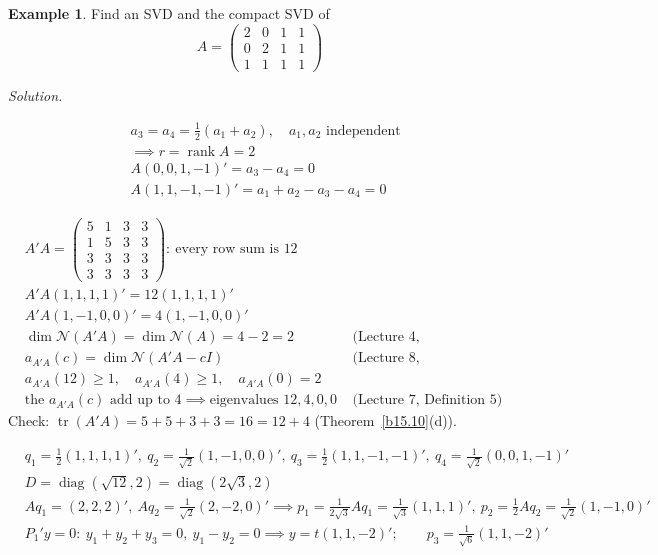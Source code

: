 \documentclass[12pt]{article}
\DeclareMathOperator{\tr}{tr}
\DeclareMathOperator{\diag}{diag}
\DeclareMathOperator{\rank}{rank}
\theoremstyle{definition}
\newtheorem{example}[theorem]{Example}
\newcommand{\lec}[1]{Lecture~#1}
\newcommand{\boardtop}{\vspace*{-\abovedisplayskip}}
\begin{document}
\begin{example}\label{b15.12}
Find an SVD and the compact SVD of
\[
A=\begin{pmatrix}2&0&1&1\\0&2&1&1\\1&1&1&1\end{pmatrix}
\]
\end{example}
\textit{Solution.}
\begin{board}[Columns \(a_1,\dots,a_4\) of \(A\); \(\rank A=\dim\mathcal C(A)\) (\lec{4}, Definition~10):]
\boardtop
\begin{align*}
&a_3=a_4=\tfrac12(a_1+a_2),\quad a_1,a_2\text{ independent}\\
&\implies r=\rank A=2\\
&A(0,0,1,-1)'=a_3-a_4=0\\
&A(1,1,-1,-1)'=a_1+a_2-a_3-a_4=0
\end{align*}
\end{board}
\begin{board}
\boardtop
\begin{align*}
&A'A=\begin{pmatrix}5&1&3&3\\1&5&3&3\\3&3&3&3\\3&3&3&3\end{pmatrix}\colon\ \text{every row sum is }12\\
&A'A(1,1,1,1)'=12(1,1,1,1)'\\
&A'A(1,-1,0,0)'=4(1,-1,0,0)'\\
&\dim\mathcal N(A'A)=\dim\mathcal N(A)=4-2=2&&\text{(\lec{4}, Theorems~16(a), 11)}\\
&a_{A'A}(c)=\dim\mathcal N(A'A-cI)&&\text{(\lec{8}, Theorem~9(b))}\\
&a_{A'A}(12)\geqslant1,\quad a_{A'A}(4)\geqslant1,\quad a_{A'A}(0)=2\\
&\text{the }a_{A'A}(c)\text{ add up to }4\implies\text{eigenvalues }12,4,0,0&&\text{(\lec{7}, Definition~5)}
\end{align*}
Check: \(\tr(A'A)=5+5+3+3=16=12+4\) (Theorem~\ref{b15.10}(d)).
\end{board}
\begin{board}[Theorem~\ref{b15.9}(b). By \lec{8}, Theorem~8, and \((1,1,-1,-1)(0,0,1,-1)'=0\), the four vectors are
pairwise orthogonal; normalize them:]
\boardtop
\begin{align*}
&q_1=\tfrac12(1,1,1,1)',\ q_2=\tfrac1{\sqrt2}(1,-1,0,0)',\ q_3=\tfrac12(1,1,-1,-1)',\ q_4=\tfrac1{\sqrt2}(0,0,1,-1)'\\
&D=\diag(\sqrt{12},2)=\diag(2\sqrt3,2)\\
&Aq_1=(2,2,2)',\ Aq_2=\tfrac1{\sqrt2}(2,-2,0)'\implies p_1=\tfrac1{2\sqrt3}Aq_1=\tfrac1{\sqrt3}(1,1,1)',\
p_2=\tfrac12Aq_2=\tfrac1{\sqrt2}(1,-1,0)'\\
&P_1'y=0\colon\ y_1+y_2+y_3=0,\ y_1-y_2=0\implies y=t(1,1,-2)';\qquad p_3=\tfrac1{\sqrt6}(1,1,-2)'
\end{align*}
\end{board}
\end{document}
